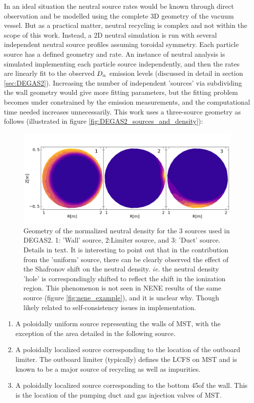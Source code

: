 In an ideal situation the neutral source rates would be known through direct observation and be modelled using the complete 3D geometry of the vacuum vessel. But as a practical matter, neutral recycling is complex and not within the scope of this work. Instead, a 2D neutral simulation is run with several independent neutral source profiles assuming toroidal symmetry. Each particle source has a defined geometry and rate. An instance of neutral analysis is simulated implementing each particle source independently, and then the rates are linearly fit to the observed $D_{\alpha}$ emission levels (discussed in detail in section \ref{sec:DEGAS2}). Increasing the number of independent 'sources' via subdividing the wall geometry would give more fitting parameters, but the fitting problem becomes under constrained by the emission measurements, and the computational time needed increases unnecessarily. This work uses a three-source geometry as follows (illustrated in figure \ref{fig:DEGAS2_sources_and_density}):
\begin{figure}
	\centering
	\includegraphics[width = 1.\linewidth]{ion_transport_results/source_comp.png}
	\caption[DEGAS2 source contributions]{Geometry of the normalized neutral density for the 3 sources used in DEGAS2. 1: 'Wall' source, 2:Limiter source, and 3: 'Duct' source. Details in text. It is interesting to point out that in the contribution from the 'uniform' source, there can be clearly observed the effect of the Shafronov shift on the neutral density. \textit{ie.} the neutral density 'hole' is correspondingly shifted to reflect the shift in the ionization region. This phenomenon is not seen in NENE results of the same source (figure \ref{fig:nene_example}), and it is unclear why. Though likely related to self-consistency issues in implementation.}\label{fig:DEGAS2_sources_contrib}
\end{figure}
\begin{enumerate}
    \item A poloidally uniform source representing the walls of MST, with the exception of the area detailed in the following source. 
    \item A poloidally localized source corresponding to the location of the outboard limiter. The outboard limiter (typically) defines the LCFS on MST and is known to be a major source of recycling as well as impurities.  
    \item A poloidally localized source corresponding to the bottom 45\textdegree of the wall. This is the location of the pumping duct and gas injection valves of MST. 
\end{enumerate}
